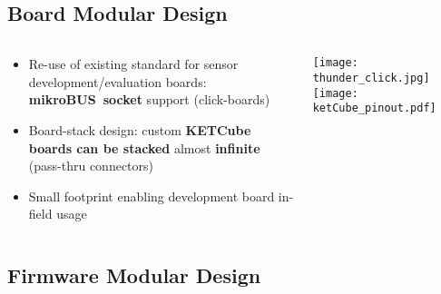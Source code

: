 \subsection{Board Modular Design}

\begin{frame}%
  \centering
  
    \begin{columns}
      \begin{column}{0.6\paperwidth}
         \centering
         \begin{itemize}
           \item Re-use of existing standard for sensor development/evaluation boards: {\bf mikroBUS\texttrademark~socket} support (click-boards)
           \item Board-stack design: custom {\bf KETCube boards can be stacked} almost {\bf infinite} (pass-thru connectors)
           \item Small footprint enabling development board in-field usage
         \end{itemize}
      \end{column}
      \begin{column}{0.4\paperwidth}
         \centering
         \texttt{[image: thunder\_click.jpg]}
         \vfill
         \texttt{[image: ketCube\_pinout.pdf]}
       \end{column}
    \end{columns}
  
\end{frame}

\subsection{Firmware Modular Design}

